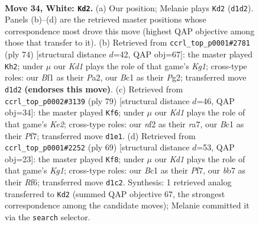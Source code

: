 \documentclass[11pt]{article}
\begin{document}
\clearpage

\begin{figure}[p]\centering
\begin{subfigure}{0.46\textwidth}\centering
\resizebox{\linewidth}{!}{%
\newchessgame
\chessboard[
  setfen={1r1r4/pb1p1pk1/8/4R3/6P1/8/PP3n2/2BK1BR1 w - - 0 34},
  showmover=false,
  pgfstyle=straightmove, color=movearrow, markmove={d1-d2}
]}
\caption{}
\end{subfigure}\hfill
\begin{subfigure}{0.46\textwidth}\centering
\resizebox{\linewidth}{!}{%
\newchessgame
\chessboard[
  setfen={5r2/1R1B1k1p/8/2rp1P1p/8/5R2/P3n1P1/6K1 w - - 2 38},
  showmover=false,
  pgfstyle=straightmove, color=movearrow, markmove={g1-h2}
]}
\caption{}
\end{subfigure}
\\[4pt]
\begin{subfigure}{0.46\textwidth}\centering
\resizebox{\linewidth}{!}{%
\newchessgame
\chessboard[
  setfen={8/R3kp2/7p/5r2/2b4P/P1r1P3/6B1/6KR b - - 1 40},
  showmover=false,
  pgfstyle=straightmove, color=movearrow, markmove={e7-f6}
]}
\caption{}
\end{subfigure}\hfill
\begin{subfigure}{0.46\textwidth}\centering
\resizebox{\linewidth}{!}{%
\newchessgame
\chessboard[
  setfen={6k1/p4p2/5r2/8/1Pr4b/2NRP3/P5R1/6K1 b - - 4 35},
  showmover=false,
  pgfstyle=straightmove, color=movearrow, markmove={g8-f8}
]}
\caption{}
\end{subfigure}
\caption{\textbf{Move 34, White: \texttt{Kd2}.} (a) Our position; Melanie plays \texttt{Kd2} (\texttt{d1d2}). Panels (b)--(d) are the retrieved master positions whose correspondence most drove this move (highest QAP objective among those that transfer to it). (b) Retrieved from \texttt{ccrl\_top\_p0001\#2781} (ply 74) [structural distance $d$=42, QAP obj=67]: the master played \texttt{Kh2}; under $\mu$ our \emph{Kd1} plays the role of that game's \emph{Kg1}; cross-type roles: our \emph{B}f1 as their \emph{P}a2, our \emph{B}c1 as their \emph{P}g2; transferred move \texttt{d1d2} \textbf{(endorses this move)}. (c) Retrieved from \texttt{ccrl\_top\_p0002\#3139} (ply 79) [structural distance $d$=46, QAP obj=34]: the master played \texttt{Kf6}; under $\mu$ our \emph{Kd1} plays the role of that game's \emph{Ke2}; cross-type roles: our \emph{n}f2 as their \emph{r}a7, our \emph{B}c1 as their \emph{P}f7; transferred move \texttt{d1e1}. (d) Retrieved from \texttt{ccrl\_top\_p0001\#2252} (ply 69) [structural distance $d$=53, QAP obj=23]: the master played \texttt{Kf8}; under $\mu$ our \emph{Kd1} plays the role of that game's \emph{Kg1}; cross-type roles: our \emph{B}c1 as their \emph{P}f7, our \emph{b}b7 as their \emph{R}f6; transferred move \texttt{d1c2}. Synthesis: 1 retrieved analog transferred to \texttt{Kd2} (summed QAP objective 67, the strongest correspondence among the candidate moves); Melanie committed it via the \texttt{search} selector.}
\label{fig:thought-m66}
\end{figure}
\end{document}
